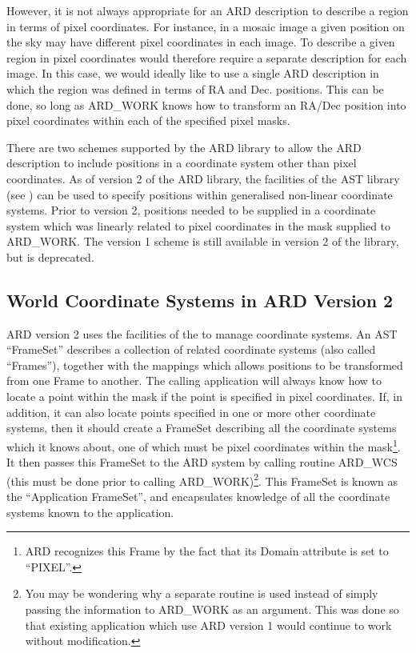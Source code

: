 \documentclass[11pt]{starlink}
\begin{document}
However, it is not always appropriate for an ARD description to describe
a region in terms of pixel coordinates. For instance, in a mosaic image
a given position on the sky may have different pixel coordinates in each
image. To describe a given region in pixel coordinates would therefore
require a separate description for each image. In this case, we would
ideally like to use a single ARD description in which the region was
defined in terms of RA and Dec. positions. This can be done, so long as
ARD\_WORK knows how to transform an RA/Dec position into pixel
coordinates within each of the specified pixel masks.

There are two schemes supported by the ARD library to allow the ARD
description to include positions in a coordinate system other than pixel
coordinates. As of version 2 of the ARD library, the facilities of the
AST library (see ) can be used to specify
positions within generalised non-linear coordinate systems. Prior to
version 2, positions needed to be supplied in a coordinate system which
was linearly related to pixel coordinates in the mask supplied to
ARD\_WORK. The version 1 scheme is still available in version 2 of the
library, but is deprecated.

\subsection{World Coordinate Systems in ARD Version 2}

ARD version 2 uses the facilities of the  to
manage coordinate systems. An AST ``FrameSet'' describes a collection of
related coordinate systems (also called ``Frames''), together with the
mappings which allows positions to be transformed from one Frame to
another. The calling application will always know how to locate a point
within the mask if the point is specified in pixel coordinates. If, in
addition, it can also locate points specified in one or more other
coordinate systems, then it should create a FrameSet describing all the
coordinate systems which it knows about, one of which must be pixel
coordinates within the mask\footnote{ARD recognizes this Frame by the
fact that its Domain attribute is set to ``PIXEL''.}. It then passes this
FrameSet to the ARD system by calling routine ARD\_WCS (this must be done
prior to calling ARD\_WORK)\footnote{You may be wondering why a separate
routine is used instead of simply passing the information to ARD\_WORK as
an argument. This was done so that existing application which use ARD
version 1 would continue to work without modification.}. This FrameSet is
known as the ``Application FrameSet'', and encapsulates knowledge of all
the coordinate systems known to the application.
\end{document}
